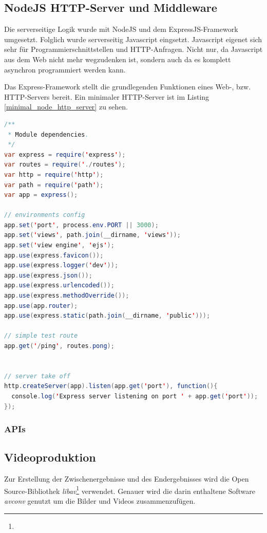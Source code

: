 \subsection{NodeJS HTTP-Server und Middleware}
Die serverseitige Logik wurde mit NodeJS und dem ExpressJS-Framework umgesetzt. Folglich wurde serverseitig Javascript eingsetzt. Javascript eigenet sich sehr für Programmierschnittstellen und HTTP-Anfragen. Nicht nur, da Javascript aus dem Web nicht mehr wegzudenken ist, sondern auch da es komplett asynchron programmiert werden kann. 

Das Express-Framework stellt die grundlegenden Funktionen eines Web-, bzw. HTTP-Servers bereit. Ein minimaler HTTP-Server ist im Listing \ref{minimal_node_http_server} zu sehen. 

\begin{lstlisting}[label=minimal_node_http_server,language=Java, caption=Minimaler Node-HTTP-Server]
/**
 * Module dependencies.
 */
var express = require('express');
var routes = require('./routes');
var http = require('http');
var path = require('path');
var app = express();

// environments config
app.set('port', process.env.PORT || 3000);
app.set('views', path.join(__dirname, 'views'));
app.set('view engine', 'ejs');
app.use(express.favicon());
app.use(express.logger('dev'));
app.use(express.json());
app.use(express.urlencoded());
app.use(express.methodOverride());
app.use(app.router);
app.use(express.static(path.join(__dirname, 'public')));

// simple test route
app.get('/ping', routes.pong);


// server take off
http.createServer(app).listen(app.get('port'), function(){
  console.log('Express server listening on port ' + app.get('port'));
});
\end{lstlisting}

\subsubsection{APIs}

\subsection{Videoproduktion}

Zur Erstellung der Zwischenergebnisse und des Endergebnisses wird die Open Source-Bibliothek \emph{libav}\footnote{} verwendet. Genauer wird die darin enthaltene Software \emph{avconv} genutzt um die Bilder und Videos zusammenzufügen. 
